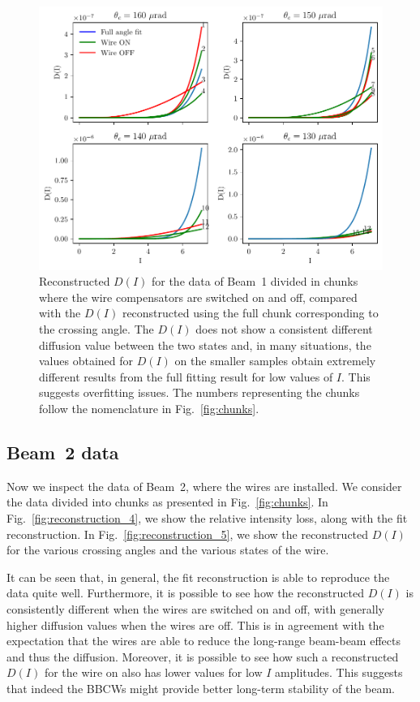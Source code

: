 \begin{figure}[th]
    \centering
    \includegraphics[width=1.0\textwidth]{5_wire_compensators_LHC/figs/fokker_planck_b1_turbo_bis.pdf}
    \caption{Reconstructed $D(I)$ for the data of Beam~1 divided in chunks where the wire compensators are switched on and off, compared with the $D(I)$ reconstructed using the full chunk corresponding to the crossing angle. The $D(I)$ does not show a consistent different diffusion value between the two states and, in many situations, the values obtained for $D(I)$ on the smaller samples obtain extremely different results from the full fitting result for low values of $I$. This suggests overfitting issues. The numbers representing the chunks follow the nomenclature in Fig.~\ref{fig:chunks}.}
    \label{fig:reconstruction_3}
\end{figure}

\subsection*{Beam~2 data}

Now we inspect the data of Beam~2, where the wires are installed. We consider the data divided into chunks as presented in Fig.~\ref{fig:chunks}. In Fig.~\ref{fig:reconstruction_4}, we show the relative intensity loss, along with the fit reconstruction. In Fig.~\ref{fig:reconstruction_5}, we show the reconstructed $D(I)$ for the various crossing angles and the various states of the wire.

It can be seen that, in general, the fit reconstruction is able to reproduce the data quite well. Furthermore, it is possible to see how the reconstructed $D(I)$ is consistently different when the wires are switched on and off, with generally higher diffusion values when the wires are off. This is in agreement with the expectation that the wires are able to reduce the long-range beam-beam effects and thus the diffusion. Moreover, it is possible to see how such a reconstructed $D(I)$ for the wire on also has lower values for low $I$ amplitudes. This suggests that indeed the BBCWs might provide better long-term stability of the beam.

